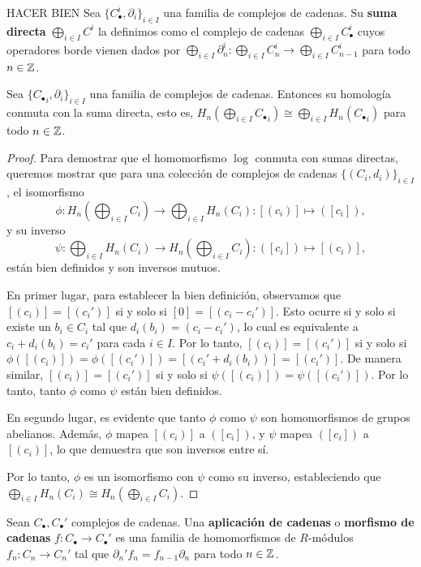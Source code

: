 \begin{definicion}HACER BIEN
	Sea $\{C_{\bullet}^i, \partial_i\}_{i \in I}$ una familia de complejos de cadenas. Su \textbf{suma directa} \( \bigoplus_{i \in I} C^i \) la definimos como el complejo de cadenas $\bigoplus_{i \in I} C^i_{\bullet}$ cuyos operadores borde vienen dados por $\bigoplus_{i \in I} {\partial}^i_n : \bigoplus_{i \in I} C^i_n \to \bigoplus_{i \in I} C^i_{n-1}$ para todo $n \in \mathbb{Z}$.
\end{definicion}
\begin{proposicion}
	\label{prop:hom-free-commute}
	Sea $\{{C_{\bullet}}_i, \partial_i\}_{i \in I}$ una familia de complejos de cadenas. Entonces su homología conmuta con la suma directa, esto es, $H_n(\bigoplus_{i \in I} {C_{\bullet}}_i) \cong \bigoplus_{i \in I} H_n({C_{\bullet}}_i)$ para todo $n \in \mathbb{Z}$.
\end{proposicion}
\begin{proof}
	Para demostrar que el homomorfismo $\log$ conmuta con sumas directas, queremos mostrar que para una colección de complejos de cadenas $\{ (C_i, d_i) \}_{i \in I}$, el isomorfismo
	\[ \phi: H_n \left( \bigoplus_{i \in I} C_i \right) \rightarrow \bigoplus_{i \in I} H_n (C_i) : [(c_i)] \mapsto ([c_i]), \]
	y su inverso
	\[ \psi: \bigoplus_{i \in I} H_n (C_i) \rightarrow H_n \left( \bigoplus_{i \in I} C_i \right) : ([c_i]) \mapsto [(c_i)], \]
	están bien definidos y son inversos mutuos.
	
	En primer lugar, para establecer la bien definición, observamos que $[(c_i)] = [(c_i')]$ si y solo si $[0] = [(c_i - c_i')]$. Esto ocurre si y solo si existe un $b_i \in C_i$ tal que $d_i(b_i) = (c_i - c_i')$, lo cual es equivalente a $c_i + d_i(b_i) = c_i'$ para cada $i \in I$. Por lo tanto, $[(c_i)] = [(c_i')]$ si y solo si $\phi([(c_i)]) = \phi([(c_i')]) = [(c_i' + d_i(b_i))] = [(c_i')]$. De manera similar, $[(c_i)] = [(c_i')]$ si y solo si $\psi([(c_i)]) = \psi([(c_i')])$. Por lo tanto, tanto $\phi$ como $\psi$ están bien definidos.
	
	En segundo lugar, es evidente que tanto $\phi$ como $\psi$ son homomorfismos de grupos abelianos. Además, $\phi$ mapea $[(c_i)]$ a $([c_i])$, y $\psi$ mapea $([c_i])$ a $[(c_i)]$, lo que demuestra que son inversos entre sí.
	
	Por lo tanto, $\phi$ es un isomorfismo con $\psi$ como su inverso, estableciendo que $\bigoplus_{i \in I} H_n (C_i) \cong H_n \left( \bigoplus_{i \in I} C_i \right)$.
\end{proof}
\begin{definicion}
	Sean $C_{\bullet},C_{\bullet}'$ complejos de cadenas. Una \textbf{aplicación de cadenas} o \textbf{morfismo de cadenas} $f: C_{\bullet} \rightarrow C_{\bullet}'$ es una familia de homomorfismos de $R$-módulos $f_n: C_n \rightarrow C_n'$ tal que $\partial_n'f_n = f_{n-1}\partial_n$ para todo $n \in \mathbb{Z}$.
\end{definicion}

